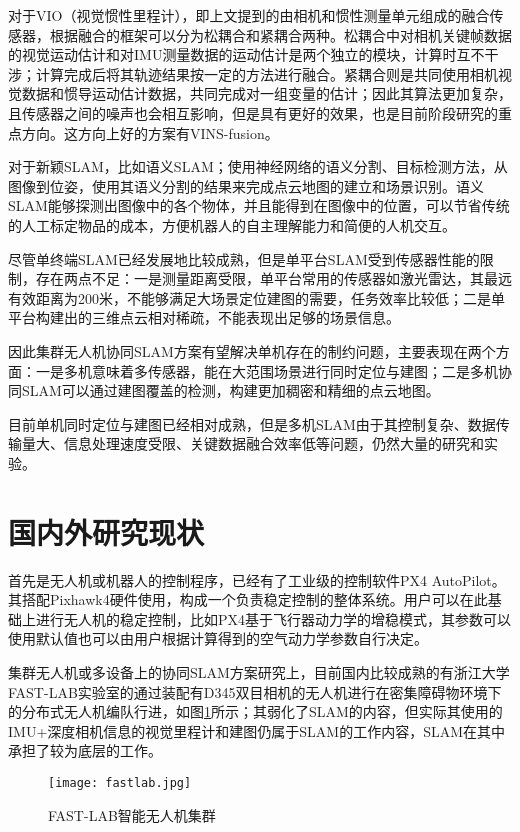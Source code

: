 对于VIO（视觉惯性里程计），即上文提到的由相机和惯性测量单元组成的融合传感器，根据融合的框架可以分为松耦合和紧耦合两种。松耦合中对相机关键帧数据的视觉运动估计和对IMU测量数据的运动估计是两个独立的模块，计算时互不干涉；计算完成后将其轨迹结果按一定的方法进行融合。紧耦合则是共同使用相机视觉数据和惯导运动估计数据，共同完成对一组变量的估计\cite{qin2018vins}；因此其算法更加复杂，且传感器之间的噪声也会相互影响，但是具有更好的效果，也是目前阶段研究的重点方向。这方向上好的方案有VINS-fusion。


对于新颖SLAM，比如语义SLAM；使用神经网络的语义分割、目标检测方法，从图像到位姿，使用其语义分割的结果来完成点云地图的建立和场景识别。语义SLAM能够探测出图像中的各个物体，并且能得到在图像中的位置，可以节省传统的人工标定物品的成本，方便机器人的自主理解能力和简便的人机交互\cite{任伟建2022移动机器人同步定位与建图技术综述}。

尽管单终端SLAM已经发展地比较成熟，但是单平台SLAM受到传感器性能的限制，存在两点不足：一是测量距离受限，单平台常用的传感器如激光雷达，其最远有效距离为200米，不能够满足大场景定位建图的需要，任务效率比较低；二是单平台构建出的三维点云相对稀疏，不能表现出足够的场景信息\cite{高家隆2019多无人机协同定位与建图技术研究}。

因此集群无人机协同SLAM方案有望解决单机存在的制约问题，主要表现在两个方面：一是多机意味着多传感器，能在大范围场景进行同时定位与建图；二是多机协同SLAM可以通过建图覆盖的检测，构建更加稠密和精细的点云地图。

目前单机同时定位与建图已经相对成熟，但是多机SLAM由于其控制复杂、数据传输量大、信息处理速度受限、关键数据融合效率低等问题，仍然大量的研究和实验。

\section{国内外研究现状}

首先是无人机或机器人的控制程序，已经有了工业级的控制软件PX4 AutoPilot。其搭配Pixhawk4硬件使用，构成一个负责稳定控制的整体系统。用户可以在此基础上进行无人机的稳定控制，比如PX4基于飞行器动力学的增稳模式，其参数可以使用默认值也可以由用户根据计算得到的空气动力学参数自行决定。

集群无人机或多设备上的协同SLAM方案研究上，目前国内比较成熟的有浙江大学FAST-LAB实验室的通过装配有D345双目相机的无人机进行在密集障碍物环境下的分布式无人机编队行进，如图\ref{fig-fastlab}所示；其弱化了SLAM的内容，但实际其使用的IMU+深度相机信息的视觉里程计和建图仍属于SLAM的工作内容，SLAM在其中承担了较为底层的工作。
~\\
\begin{figure}[!ht]
	\centering
	\texttt{[image: fastlab.jpg]}
	\caption{FAST-LAB智能无人机集群} 
	\label{fig-fastlab}
\end{figure}

